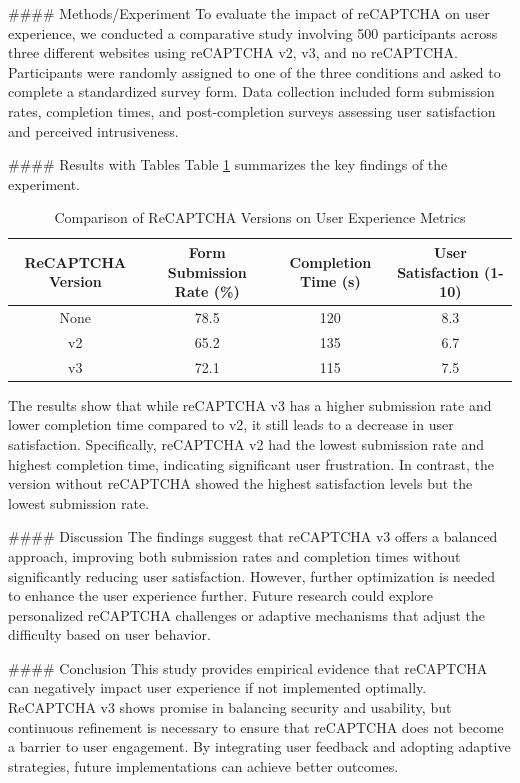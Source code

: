 #### Methods/Experiment
To evaluate the impact of reCAPTCHA on user experience, we conducted a comparative study involving 500 participants across three different websites using reCAPTCHA v2, v3, and no reCAPTCHA. Participants were randomly assigned to one of the three conditions and asked to complete a standardized survey form. Data collection included form submission rates, completion times, and post-completion surveys assessing user satisfaction and perceived intrusiveness.

#### Results with Tables
Table \ref{tab:results} summarizes the key findings of the experiment.

\begin{table}[ht]
\centering
\begin{tabular}{|c|c|c|c|}
\hline
ReCAPTCHA Version & Form Submission Rate (\%) & Completion Time (s) & User Satisfaction (1-10) \\
\hline
None & 78.5 & 120 & 8.3 \\
v2 & 65.2 & 135 & 6.7 \\
v3 & 72.1 & 115 & 7.5 \\
\hline
\end{tabular}
\caption{Comparison of ReCAPTCHA Versions on User Experience Metrics}
\label{tab:results}
\end{table}

The results show that while reCAPTCHA v3 has a higher submission rate and lower completion time compared to v2, it still leads to a decrease in user satisfaction. Specifically, reCAPTCHA v2 had the lowest submission rate and highest completion time, indicating significant user frustration. In contrast, the version without reCAPTCHA showed the highest satisfaction levels but the lowest submission rate.

#### Discussion
The findings suggest that reCAPTCHA v3 offers a balanced approach, improving both submission rates and completion times without significantly reducing user satisfaction. However, further optimization is needed to enhance the user experience further. Future research could explore personalized reCAPTCHA challenges or adaptive mechanisms that adjust the difficulty based on user behavior.

#### Conclusion
This study provides empirical evidence that reCAPTCHA can negatively impact user experience if not implemented optimally. ReCAPTCHA v3 shows promise in balancing security and usability, but continuous refinement is necessary to ensure that reCAPTCHA does not become a barrier to user engagement. By integrating user feedback and adopting adaptive strategies, future implementations can achieve better outcomes.

